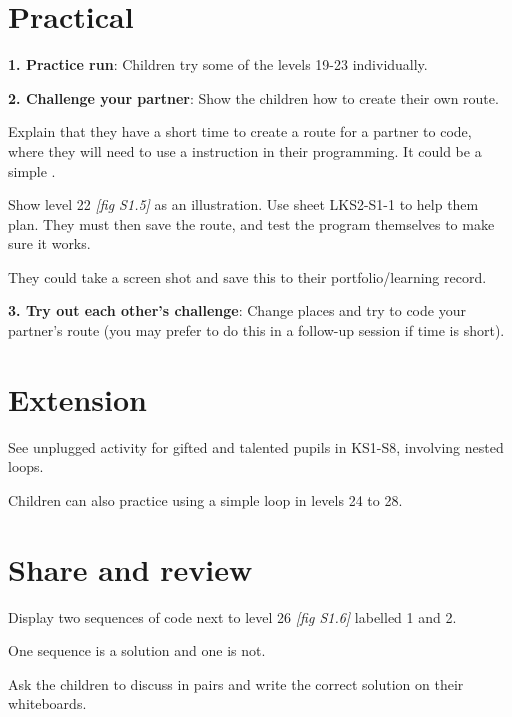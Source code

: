 \documentclass{../../../lessonplan}
\begin{document}
\begin{lessonplan}
\section*{Practical}

\textbf{1. Practice run}: Children try some of the levels 19-23 individually.

\textbf{2. Challenge your partner}: Show the children how to create their own route.

Explain that they have a short time to create a route for a partner to code, where they will need to use a  instruction in their programming.
It could be a simple .

Show level 22 \textit{[fig S1.5]} as an illustration.
Use sheet LKS2-S1-1 to help them plan.
They must then save the route, and test the program themselves to make sure it works.


They could take a screen shot and save this to their portfolio/learning record.

\textbf{3. Try out each other's challenge}: Change places and try to code your partner's route (you may prefer to do this in a follow-up session if time is short).

\section*{Extension}

See unplugged activity for gifted and talented pupils in KS1-S8, involving nested  loops.

Children can also practice using a simple  loop in levels 24 to 28.

\section*{Share and review}

Display two sequences of code next to level 26 \textit{[fig S1.6]} labelled 1 and 2.



One sequence is a solution and one is not.

Ask the children to discuss in pairs and write the correct solution on their whiteboards.




\end{lessonplan}
\end{document}
